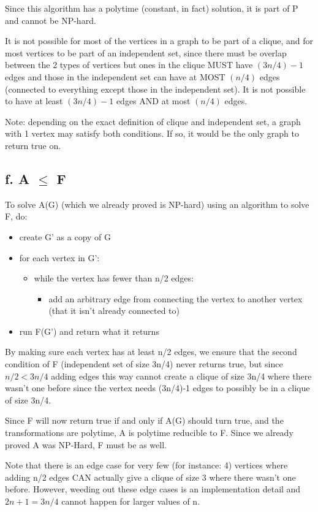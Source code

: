 \documentclass[a4paper]{article}
\begin{document}
Since this algorithm has a polytime (constant, in fact) solution, it is part of P and cannot be NP-hard.

It is not possible for most of the vertices in a graph to be part of a clique, and for most vertices to be part of an independent set, since there must be overlap between the 2 types of vertices but ones in the clique MUST have $(3n/4) -1$ edges and those in the independent set can have at MOST $(n/4)$ edges (connected to everything except those in the independent set). It is not possible to have at least $(3n/4) -1$ edges AND at most $(n/4)$ edges.

Note: depending on the exact definition of clique and independent set, a graph with 1 vertex may satisfy both conditions. If so, it would be the only graph to return true on.

\subsection{f. A $\leq$ F}
To solve A(G) (which we already proved is NP-hard) using an algorithm to solve F, do:

\begin{itemize}
    \item create G' as a copy of G
    \item for each vertex in G':
    \begin{itemize}
        \item while the vertex has fewer than n/2 edges:
        \begin{itemize}
            \item add an arbitrary edge from connecting the vertex to another vertex (that it isn't already connected to)
        \end{itemize}
    \end{itemize}
    \item run F(G') and return what it returns
\end{itemize}

By making sure each vertex has at least n/2 edges, we ensure that the second condition of F (independent set of size 3n/4) never returns true, but since $n/2<3n/4$ adding edges this way cannot create a clique of size 3n/4 where there wasn't one before since the vertex needs (3n/4)-1 edges to possibly be in a clique of size 3n/4.

Since F will now return true if and only if A(G) should turn true, and the transformations are polytime, A is polytime reducible to F. Since we already proved A was NP-Hard, F must be as well.

Note that there is an edge case for very few (for instance: 4) vertices where adding n/2 edges CAN actually give a clique of size 3 where there wasn't one before. However, weeding out these edge cases is an implementation detail and $2n+1=3n/4$ cannot happen for larger values of n.
\end{document}
